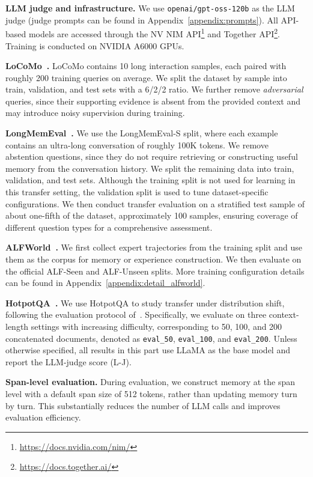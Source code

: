 \textbf{LLM judge and infrastructure.}
We use \texttt{openai/gpt-oss-120b} as the LLM judge (judge prompts can be found in Appendix~\ref{appendix:prompts}). All API-based models are accessed through the NV NIM API\footnote{\url{https://docs.nvidia.com/nim/}} and Together API\footnote{\url{https://docs.together.ai/}}. Training is conducted on NVIDIA A6000 GPUs.

\textbf{LoCoMo~\citep{maharana2024evaluating-locomo}.}
LoCoMo contains 10 long interaction samples, each paired with roughly 200 training queries on average. We split the dataset by sample into train, validation, and test sets with a 6/2/2 ratio. We further remove \emph{adversarial} queries, since their supporting evidence is absent from the provided context and may introduce noisy supervision during training.

\textbf{LongMemEval~\citep{wu2024longmemeval}.}
We use the LongMemEval-S split, where each example contains an ultra-long conversation of roughly 100K tokens. We remove abstention questions, since they do not require retrieving or constructing useful memory from the conversation history. We split the remaining data into train, validation, and test sets. Although the training split is not used for learning in this transfer setting, the validation split is used to tune dataset-specific configurations. We then conduct transfer evaluation on a stratified test sample of about one-fifth of the dataset, approximately 100 samples, ensuring coverage of different question types for a comprehensive assessment.

\textbf{ALFWorld~\citep{shridhar2020alfworld}.}
We first collect expert trajectories from the training split and use them as the corpus for memory or experience construction. We then evaluate on the official ALF-Seen and ALF-Unseen splits. More training configuration details can be found in Appendix~\ref{appendix:detail_alfworld}.

\textbf{HotpotQA~\citep{yang2018hotpotqa}.}
We use HotpotQA to study transfer under distribution shift, following the evaluation protocol of~\citep{yu2025memagent}. Specifically, we evaluate on three context-length settings with increasing difficulty, corresponding to 50, 100, and 200 concatenated documents, denoted as \texttt{eval\_50}, \texttt{eval\_100}, and \texttt{eval\_200}. Unless otherwise specified, all results in this part use LLaMA as the base model and report the LLM-judge score (L-J).

\textbf{Span-level evaluation.}
During evaluation, we construct memory at the span level with a default span size of 512 tokens, rather than updating memory turn by turn. This substantially reduces the number of LLM calls and improves evaluation efficiency.









